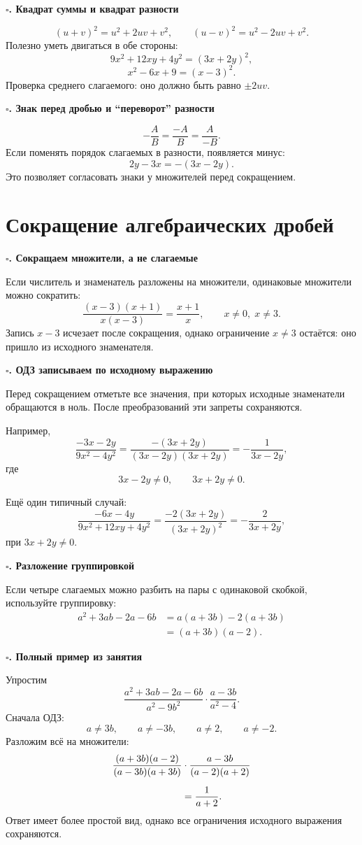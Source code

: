 \documentclass[a4paper,12pt]{article}
\newcommand{\topic}[1]{%
  \vspace{0.45em}
  {\large\bfseries\color{darkaccent}$\square$\;#1}\par
  \vspace{0.25em}
}
\begin{document}
\topic{3. Квадрат суммы и квадрат разности}
\[
(u+v)^2=u^2+2uv+v^2,
\qquad
(u-v)^2=u^2-2uv+v^2.
\]
Полезно уметь двигаться в обе стороны:
\[
9x^2+12xy+4y^2=(3x+2y)^2,
\]
\[
x^2-6x+9=(x-3)^2.
\]
Проверка среднего слагаемого: оно должно быть равно $\pm 2uv$.

\topic{4. Знак перед дробью и ``переворот'' разности}
\[
-\frac{A}{B}=\frac{-A}{B}=\frac{A}{-B}.
\]
Если поменять порядок слагаемых в разности, появляется минус:
\[
2y-3x=-(3x-2y).
\]
Это позволяет согласовать знаки у множителей перед сокращением.

\clearpage
\section*{Сокращение алгебраических дробей}

\topic{5. Сокращаем множители, а не слагаемые}
Если числитель и знаменатель разложены на множители, одинаковые множители можно сократить:
\[
\frac{(x-3)(x+1)}{x(x-3)}=\frac{x+1}{x},
\qquad x\ne0,\;x\ne3.
\]
Запись $x-3$ исчезает после сокращения, однако ограничение $x\ne3$ остаётся: оно пришло из исходного знаменателя.

\topic{6. ОДЗ записываем по исходному выражению}
Перед сокращением отметьте все значения, при которых исходные знаменатели обращаются в ноль. После преобразований эти запреты сохраняются.

Например,
\[
\frac{-3x-2y}{9x^2-4y^2}
=\frac{-(3x+2y)}{(3x-2y)(3x+2y)}
=-\frac{1}{3x-2y},
\]
где
\[
3x-2y\ne0,\qquad 3x+2y\ne0.
\]

Ещё один типичный случай:
\[
\frac{-6x-4y}{9x^2+12xy+4y^2}
=\frac{-2(3x+2y)}{(3x+2y)^2}
=-\frac{2}{3x+2y},
\]
при $3x+2y\ne0$.

\topic{7. Разложение группировкой}
Если четыре слагаемых можно разбить на пары с одинаковой скобкой, используйте группировку:
\begin{align*}
 a^2+3ab-2a-6b
 &=a(a+3b)-2(a+3b)\\
 &=(a+3b)(a-2).
\end{align*}

\clearpage
\topic{8. Полный пример из занятия}
Упростим
\[
\frac{a^2+3ab-2a-6b}{a^2-9b^2}\cdot
\frac{a-3b}{a^2-4}.
\]
Сначала ОДЗ:
\[
a\ne3b,\qquad a\ne-3b,\qquad a\ne2,\qquad a\ne-2.
\]
Разложим всё на множители:
\begin{align*}
&\frac{(a+3b)(a-2)}{(a-3b)(a+3b)}\cdot
\frac{a-3b}{(a-2)(a+2)}\\[2mm]
&\hspace{25mm}=\frac{1}{a+2}.
\end{align*}
Ответ имеет более простой вид, однако все ограничения исходного выражения сохраняются.
\end{document}
